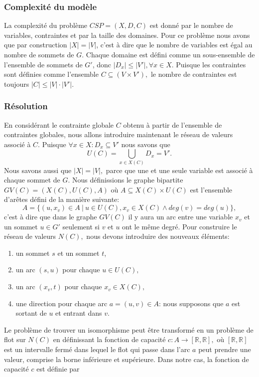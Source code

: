\documentclass[french]{article}
\theoremstyle{definition}
\theoremstyle{remark}
\begin{document}
\subsubsection{Complexité du modèle}
\label{subsubsec:compl1}
La complexité du problème $CSP=(X,D,C)$ est donné par le nombre de variables, contraintes et par la taille des domaines. Pour ce problème nous avons que par construction $|X|=|V|$, c'est à dire que le nombre de variables est égal au nombre de sommets de $G$. Chaque domaine est défini comme un sous-ensemble de l'ensemble de sommets de $G'$, donc $|D_x| \leq |V'|, \forall x \in X.$ Puisque les contraintes sont définies comme l'ensemble $C \subseteq (V \times V'),$ le nombre de contraintes est toujours $|C| \leq |V| \cdot |V'|.$

\subsubsection{Résolution}
En considérant le contrainte globale $C$ obtenu à partir de l'ensemble de contraintes globales, nous allons introduire maintenant le réseau de valeurs \cite{regin} associé à $C$. Puisque $\forall x \in X: D_x \subseteq V'$ nous savons que
$$U(C)=\bigcup_{x \in X(C)} D_x = V'.$$
Nous savons aussi que $|X|=|V|,$ parce que une et une seule variable est associé à chaque sommet de $G$. Nous définissions le graphe bipartite $GV(C)=(X(C), U(C), A)$ où $A \subseteq X(C) \times U(C)$ est l'ensemble d'arêtes défini de la manière suivante:
$$A=\{(u, x_v) \in A\ |\ u \in U(C), x_v \in X(C) \land deg(v)=deg(u) \},$$
c'est à dire que dans le graphe $GV(C)$ il y aura un arc entre une variable $x_v$ et un sommet $u \in G'$ seulement si $v$ et $u$ ont le même degré. 
Pour construire le réseau de valeurs $N(C),$ nous devons introduire des nouveaux éléments:
\begin{enumerate}
	\item un sommet $s$ et un sommet $t$,
	\item un arc $(s, u)$ pour chaque $u \in U(C),$
	\item un arc $(x_v, t)$ pour chaque $x_v \in X(C),$
	\item une direction pour chaque arc $a=(u,v) \in A$: nous supposons que $a$ est sortant de $u$ et entrant dans $v$.
\end{enumerate}
 Le problème de trouver un isomorphisme peut être transformé en un problème de flot sur $N(C)$ en définissant la fonction de capacité $c: A \rightarrow [\mathbb{R}, \mathbb{R}],$ où  $[\mathbb{R}, \mathbb{R}]$ est un intervalle fermé dans lequel le flot qui passe dans l'arc $a$ peut prendre une valeur, comprise la borne inférieure et supérieure. Dans notre cas, la fonction de capacité $c$ est définie par
\end{document}
